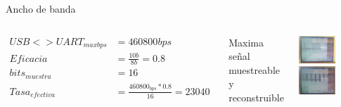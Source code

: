  \begin{frame}[t]{Ancho de banda}{}
    \handsonicon
    \begin{columns}[onlytextwidth]
       \begin{align*}
          USB<>UART_{max bps} &= 460800 bps \\
          Eficacia                 &= \frac{10b}{8b} = 0.8\\
          bits_{muestra}           &= 16 \\
          Tasa_{efectiva}          &= \frac{460800_{bps}*0.8}{16} = 23040
       \end{align*}
          \begin{block}{Maxima señal muestreable y reconstruible}
          \end{block}
       \center\includegraphics[width=0.6\textwidth]{2_clase/osci1}
       \center\includegraphics[width=0.6\textwidth]{2_clase/osci2}
    \end{columns}
    \vfill
 \end{frame}
